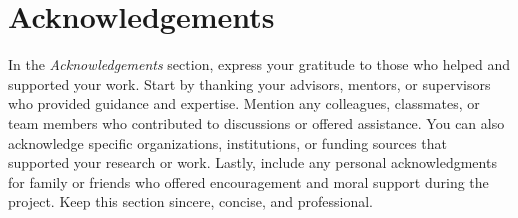 {%
    \chapter*{Acknowledgements}
}

In the \textit{Acknowledgements} section, express your gratitude to those who helped and supported your work. Start by thanking your advisors, mentors, or supervisors who provided guidance and expertise. Mention any colleagues, classmates, or team members who contributed to discussions or offered assistance. You can also acknowledge specific organizations, institutions, or funding sources that supported your research or work. Lastly, include any personal acknowledgments for family or friends who offered encouragement and moral support during the project. Keep this section sincere, concise, and professional.

\MediaOptionLogicBlank